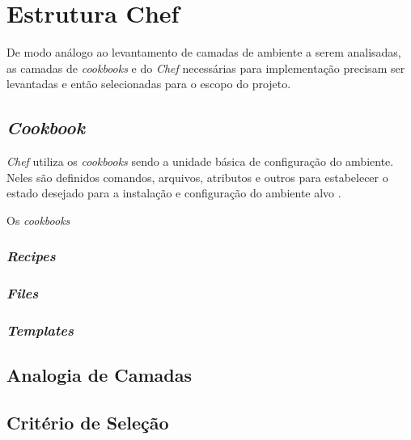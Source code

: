 \section{Estrutura Chef}
De modo análogo ao levantamento de camadas de ambiente a serem analisadas,
as camadas de \textit{cookbooks} e do \textit{Chef} necessárias para implementação precisam
ser levantadas e então selecionadas para o escopo do projeto.

\subsection{\textit{Cookbook}}

\textit{Chef} utiliza os \textit{cookbooks} sendo a unidade básica de configuração do
ambiente. Neles são definidos comandos, arquivos, atributos e outros
para estabelecer o estado desejado para a instalação e configuração
do ambiente alvo \cite{sharma:2015}.

Os \textit{cookbooks} 


\subsubsection{\textit{Recipes}}
\subsubsection{\textit{Files}}
\subsubsection{\textit{Templates}}

\subsection{Analogia de Camadas}

\subsection{Critério de Seleção}

